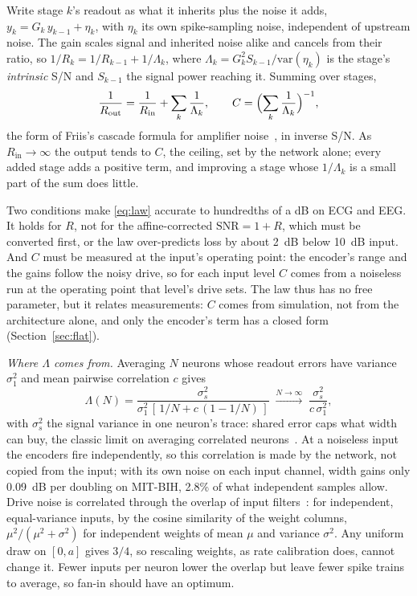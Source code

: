 \documentclass[conference]{IEEEtran}
\newcommand{\SN}{R}            %
\newcommand{\dB}{~dB}
\begin{document}
Write stage $k$'s readout as what it inherits plus the noise it adds,
$y_k = G_k\, y_{k-1} + \eta_k$, with $\eta_k$ its own spike-sampling noise,
independent of upstream noise. The gain scales signal and inherited noise
alike and cancels from their ratio, so $1/\SN_k = 1/\SN_{k-1} + 1/\Lambda_k$,
where $\Lambda_k = G_k^2 S_{k-1}/\mathrm{var}(\eta_k)$ is the stage's
\emph{intrinsic} S/N and $S_{k-1}$ the signal power reaching it. Summing over
stages,
\begin{equation}
\frac{1}{\SN_\mathrm{out}} = \frac{1}{\SN_\mathrm{in}} + \sum_k
\frac{1}{\Lambda_k}, \qquad
C = \Bigl(\sum_k \frac{1}{\Lambda_k}\Bigr)^{-1},
\label{eq:law}
\end{equation}
the form of Friis's cascade formula for amplifier
noise~\cite{friis1944noise}, in inverse S/N. As $\SN_\mathrm{in} \to \infty$
the output tends to $C$, the ceiling, set by the network alone; every added
stage adds a positive term, and improving a stage whose $1/\Lambda_k$ is a
small part of the sum does little.

Two conditions make \eqref{eq:law} accurate to hundredths of a dB on ECG and
EEG. It holds for $\SN$, not for the affine-corrected $\mathrm{SNR} = 1 + \SN$,
which must be converted first, or the law over-predicts loss by about 2\dB{}
below 10\dB{} input. And $C$ must be measured at the input's operating point:
the encoder's range and the gains follow the noisy drive, so for each input
level $C$ comes from a noiseless run at the operating point that level's drive
sets. The law thus has no free parameter, but it relates measurements: $C$
comes from simulation, not from the architecture alone, and only the
encoder's term has a closed form (Section~\ref{sec:flat}).

\emph{Where $\Lambda$ comes from.} Averaging $N$ neurons whose readout errors
have variance $\sigma_1^2$ and mean pairwise correlation $c$ gives
\begin{equation}
\Lambda(N) = \frac{\sigma_s^2}{\sigma_1^2\,[\,1/N + c\,(1-1/N)\,]}
\;\xrightarrow{N\to\infty}\; \frac{\sigma_s^2}{c\,\sigma_1^2},
\label{eq:width}
\end{equation}
with $\sigma_s^2$ the signal variance in one neuron's trace: shared error caps
what width can buy, the classic limit on averaging correlated
neurons~\cite{zohary1994correlated}. At a noiseless input the encoders fire
independently, so this correlation is made by the network, not copied from the
input; with its own noise on each input channel, width gains only 0.09\dB{}
per doubling on MIT-BIH, 2.8\% of what independent samples allow. Drive noise
is correlated through the overlap of input
filters~\cite{kanitscheider2015origin}: for independent, equal-variance
inputs, by the cosine similarity of the weight columns, $\mu^2/(\mu^2+\sigma^2)$
for independent weights of mean $\mu$ and variance $\sigma^2$. Any uniform
draw on $[0,a]$ gives $3/4$, so rescaling weights, as rate calibration does,
cannot change it. Fewer inputs per neuron lower the overlap but leave fewer
spike trains to average, so fan-in should have an optimum.
\end{document}

